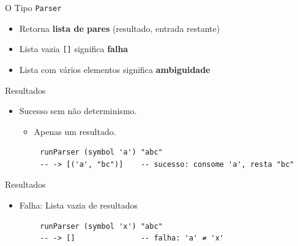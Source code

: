 \begin{frame}[fragile]{O Tipo \texttt{Parser}}

    \begin{itemize}

        \item
        Retorna \textbf{lista de pares} (resultado, entrada restante)
        \item
        Lista vazia \texttt{[]} significa \textbf{falha}
        \item
        Lista com vários elementos significa \textbf{ambiguidade}
    \end{itemize}
\end{frame}

\begin{frame}[fragile]{Resultados}

    \begin{itemize}

        \item
        Sucesso sem não determinismo.

        \begin{itemize}

            \item
            Apenas um resultado.
        \end{itemize}
    \end{itemize}

    \begin{lstlisting}
        runParser (symbol 'a') "abc"
        -- -> [('a', "bc")]    -- sucesso: consome 'a', resta "bc"
    \end{lstlisting}
\end{frame}

\begin{frame}[fragile]{Resultados}

    \begin{itemize}

        \item
        Falha: Lista vazia de resultados
    \end{itemize}

    \begin{lstlisting}
        runParser (symbol 'x') "abc"
        -- -> []               -- falha: 'a' ≠ 'x'
    \end{lstlisting}
\end{frame}

